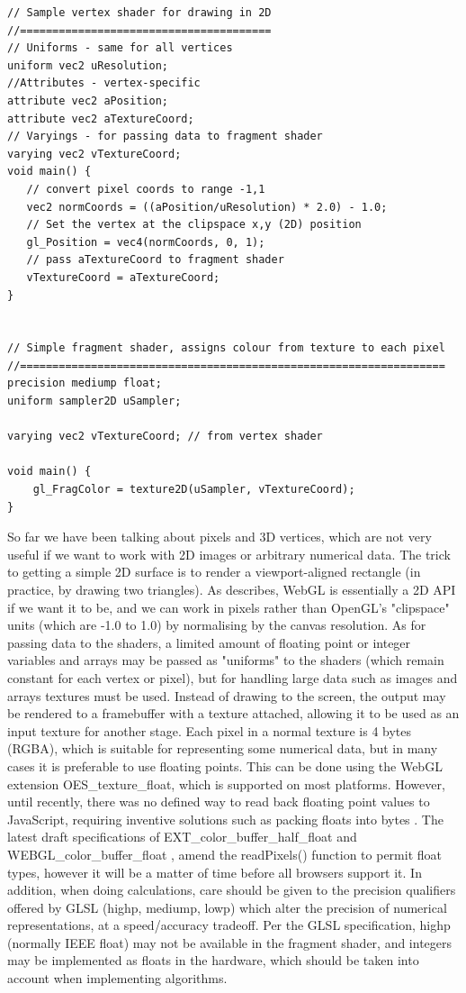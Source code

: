 \documentclass[a4paper]{article}
\begin{document}
\begin{verbatim}
// Sample vertex shader for drawing in 2D
//=======================================
// Uniforms - same for all vertices
uniform vec2 uResolution;
//Attributes - vertex-specific
attribute vec2 aPosition;
attribute vec2 aTextureCoord;
// Varyings - for passing data to fragment shader
varying vec2 vTextureCoord;
void main() {
   // convert pixel coords to range -1,1
   vec2 normCoords = ((aPosition/uResolution) * 2.0) - 1.0;
   // Set the vertex at the clipspace x,y (2D) position
   gl_Position = vec4(normCoords, 0, 1);
   // pass aTextureCoord to fragment shader
   vTextureCoord = aTextureCoord;
}


// Simple fragment shader, assigns colour from texture to each pixel
//==================================================================
precision mediump float;
uniform sampler2D uSampler;

varying vec2 vTextureCoord; // from vertex shader
       
void main() {
    gl_FragColor = texture2D(uSampler, vTextureCoord);
}
\end{verbatim}

So far we have been talking about pixels and 3D vertices, which are not very useful if we want to work with 2D images or arbitrary numerical data. The trick to getting a simple 2D surface is to render a viewport-aligned rectangle (in practice, by drawing two triangles). As \cite{Greggman} describes, WebGL is essentially a 2D API if we want it to be, and we can work in pixels rather than OpenGL's "clipspace" units (which are -1.0 to 1.0) by normalising by the canvas resolution. As for passing data to the shaders, a limited amount of floating point or integer variables and arrays may be passed as "uniforms" to the shaders (which remain constant for each vertex or pixel), but for handling large data such as images and arrays textures must be used. Instead of drawing to the screen, the output may be rendered to a framebuffer with a texture attached, allowing it to be used as an input texture for another stage. Each pixel in a normal texture is 4 bytes (RGBA), which is suitable for representing some numerical data, but in many cases it is preferable to use floating points. This can be done using the WebGL extension OES\_texture\_float, which is supported on most platforms. However, until recently, there was no defined way to read back floating point values to JavaScript, requiring inventive solutions such as packing floats into bytes \cite{webgl-gpgpu}. The latest draft specifications of EXT\_color\_buffer\_half\_float \cite{colorbufhalf} and WEBGL\_color\_buffer\_float \cite{colorbuf}, amend the readPixels() function to permit float types, however it will be a matter of time before all browsers support it. In addition, when doing calculations, care should be given to the precision qualifiers offered by GLSL (highp, mediump, lowp) which alter the precision of numerical representations, at a speed/accuracy tradeoff. Per the GLSL specification, highp (normally IEEE float) may not be available in the fragment shader, and integers may be implemented as floats in the hardware, which should be taken into account when implementing algorithms.
\end{document}
